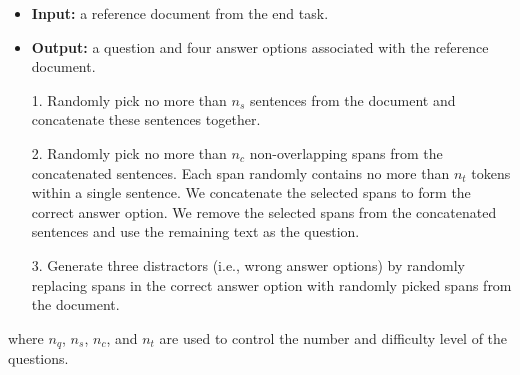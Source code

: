 \documentclass[11pt,a4paper]{article}
\newcommand{\ie}{{i.e.}}
\begin{document}
\vspace{-\topsep}
\begin{itemize}
\setlength\itemsep{-0.25em}
\item \textbf{Input:}  a reference document from the end task.
    \item \textbf{Output:} a question and four answer options associated with the reference document.
    \item[1.] Randomly pick no more than $n_{s}$ sentences from the document and concatenate these sentences together.
    \item[2.] Randomly pick no more than $n_{c}$ non-overlapping spans from the concatenated sentences. Each span randomly contains no more than $n_{t}$ tokens within a single sentence. We concatenate the selected spans to form the correct answer option. We remove the selected spans from the concatenated sentences and use the remaining text as the question.
    \item[3.] Generate three distractors (\ie, wrong answer options) by randomly replacing spans in the correct answer option with randomly picked spans from the document.
\end{itemize}
\vspace{-\topsep}
where $n_q$, $n_s$, $n_c$, and $n_t$ are used to control the number and difficulty level of the questions.
\end{document}
